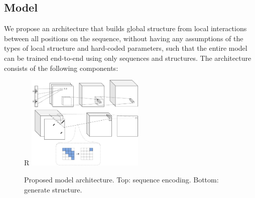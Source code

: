 \documentclass{article}
\begin{document}



\subsection{Model}


We propose an architecture that builds global structure from local interactions between all positions on the sequence,
without having any assumptions of the types of local structure and hard-coded parameters,
such that the entire model can be trained end-to-end using only sequences and structures.
The architecture consists of the following components:

\begin{figure}{R}
        \centering
        \includegraphics[width=0.5\textwidth]{plot/nn_arch_1.pdf}
        \caption{Proposed model architecture. Top: sequence encoding. Bottom: generate structure.}
        \label{fig:nn_arch_1}
        \centering
\end{figure}



%

\end{document}
